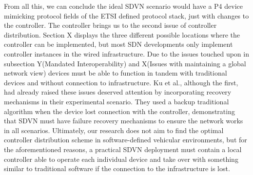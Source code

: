     From all this, we can conclude the ideal SDVN scenario would have a P4 device mimicking protocol fields of the ETSI defined protocol stack, just with changes to the controller.
    The controller brings us to the second issue of controller distribution. Section X displays the three different possible locations where the controller can be implemented, but most SDN developments only implement controller instances in the wired infrastructure. Due to the issues touched upon in subsection Y(Mandated Interoperability) and X(Issues with maintaining a global network view) devices must be able to function in tandem with traditional devices and without connection to infrastructure. 
    Ku et al.\cite{Ku et al., 2014}, although the first, had already raised these issues deserved attention by incorporating recovery mechanisms in their experimental scenario. They used a backup traditional algorithm when the device lost connection with the controller, demonstrating that SDVN must have failure recovery mechanisms to ensure the network works in all scenarios.
    Ultimately, our research does not aim to find the optimal controller distribution scheme in software-defined vehicular environments, but for the aforementioned reasons, a practical SDVN deployment must contain a local controller able to operate each individual device and take over with something similar to traditional software if the connection to the infrastructure is lost. 
    